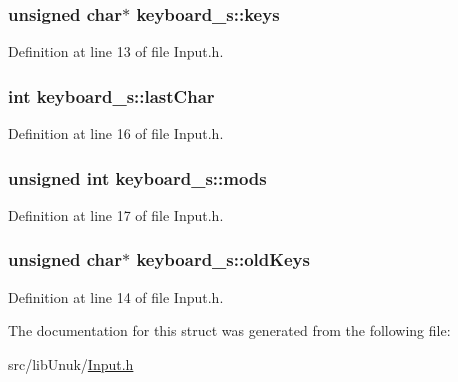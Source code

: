 \hypertarget{structkeyboard__s_a2ba5b397f8ff5edfd0f363a7df1a750b}{
\subsubsection[{keys}]{\setlength{\rightskip}{0pt plus 5cm}unsigned char$\ast$ {\bf keyboard\_\-s::keys}}}
\label{structkeyboard__s_a2ba5b397f8ff5edfd0f363a7df1a750b}


Definition at line 13 of file Input.h.

\hypertarget{structkeyboard__s_a873208e1bd98fd795e48585099773264}{
\subsubsection[{lastChar}]{\setlength{\rightskip}{0pt plus 5cm}int {\bf keyboard\_\-s::lastChar}}}
\label{structkeyboard__s_a873208e1bd98fd795e48585099773264}


Definition at line 16 of file Input.h.

\hypertarget{structkeyboard__s_a521c6a85083a1d631259f8e5aeab8ca6}{
\subsubsection[{mods}]{\setlength{\rightskip}{0pt plus 5cm}unsigned int {\bf keyboard\_\-s::mods}}}
\label{structkeyboard__s_a521c6a85083a1d631259f8e5aeab8ca6}


Definition at line 17 of file Input.h.

\hypertarget{structkeyboard__s_a2a66955df8ac60c01417a021ac171220}{
\subsubsection[{oldKeys}]{\setlength{\rightskip}{0pt plus 5cm}unsigned char$\ast$ {\bf keyboard\_\-s::oldKeys}}}
\label{structkeyboard__s_a2a66955df8ac60c01417a021ac171220}


Definition at line 14 of file Input.h.



The documentation for this struct was generated from the following file:\begin{DoxyCompactItemize}
\item 
src/libUnuk/\hyperlink{_input_8h}{Input.h}\end{DoxyCompactItemize}
